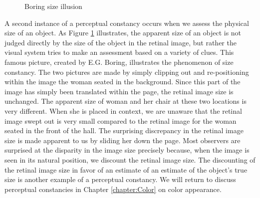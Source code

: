 \begin{figure}
\centerline{
}
\caption[Boring Size Illusion]{
Boring size illusion
}
\label{f6:Boring}
\end{figure}
A second instance of a perceptual constancy
occurs when we assess the physical size of an object.
As Figure \ref{f6:Boring} 
illustrates, the apparent size of an object is not judged
directly by the size of the object in the retinal image,
but rather the visual system tries to make an assessment
based on a variety of clues.
This famous picture, created by E.G. Boring,
illustrates the phenomenon of size constancy.
The two pictures are made by simply clipping out and re-positioning
within the image the woman seated in the background.
Since this part of the image has simply been translated within
the page, the retinal image size is unchanged.
The apparent size of woman and her chair at these two
locations is very different.
When she is placed in context, we are unaware
that the retinal image swept out is very small compared
to the retinal image for the woman seated in the front of the hall.
The surprising discrepancy in the retinal image size is 
made apparent to us by sliding her down the page.
Most observers are surprised at the disparity in the image
size precisely because, when the image is seen in its
natural position, we discount the retinal image size.
The discounting of the retinal image size
in favor of an estimate of an estimate of the
object's true size is another example
of a perceptual constancy.
We will return to discuss perceptual constancies in
Chapter \ref{chapter:Color} on color appearance.


